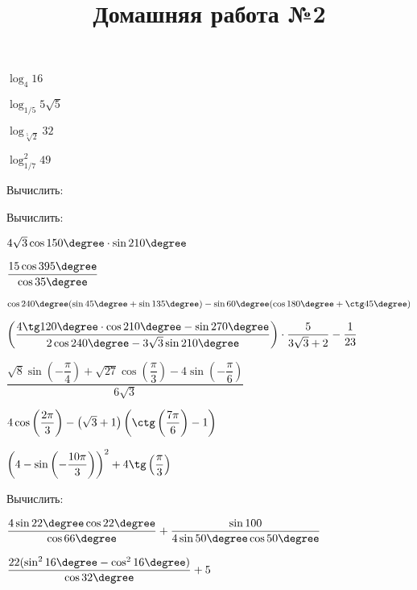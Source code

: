 \begin{listofex}
\begin{enumcols}[itemcolumns=4]
		\item \( \log_4 16 \)
		\item \( \log_{1/5}5\sqrt{5} \)
		\item \( \log_{\sqrt[5]{2}}32 \)
		\item \( \log_{1/7}^2 49 \)
	\end{enumcols}
	\item Вычислить:
	\begin{enumcols}[itemcolumns=1]
		\item {}
		\item {}
	\end{enumcols}
	\item {}
\end{listofex}
\newpage
\title{Домашняя работа №2}
\begin{listofex}
	\item Вычислить:
	\begin{enumcols}[itemcolumns=1]
		\item \( 4\sqrt{3}\cos150\degree\cdot\sin210\degree \) 
		\item \( \dfrac{15\cos395\degree}{\cos35\degree} \)
		\item \( \cos240\degree(\sin45\degree+\sin135\degree)-\sin60\degree(\cos180\degree+\ctg45\degree) \)
		\item \( \left( \dfrac{4\tg120\degree\cdot\cos210\degree-\sin270\degree}{2\cos240\degree-3\sqrt{3}\sin210\degree} \right)\cdot\dfrac{5}{3\sqrt{3}+2}-\dfrac{1}{23} \)
		\item \( \dfrac{\sqrt{8}\sin\left( -\dfrac{\pi}{4} \right)+\sqrt{27}\cos\left( \dfrac{\pi}{3} \right)-4\sin\left( -\dfrac{\pi}{6} \right)}{6\sqrt{3}} \) 
		\item \( 4\cos\left( \dfrac{2\pi}{3} \right)-\left( \sqrt{3}+1 \right)\left( \ctg\left( \dfrac{7\pi}{6} \right)-1 \right) \) 
		\item \( \left( 4 - \sin\left( -\dfrac{10\pi}{3} \right) \right)^2+4\tg\left( \dfrac{\pi}{3} \right) \) 
	\end{enumcols}
	\item Вычислить:
	\begin{enumcols}[itemcolumns=1]
		\item \( \dfrac{4\sin22\degree\cos22\degree}{\cos66\degree}+\dfrac{\sin100}{4\sin50\degree\cos50\degree} \)
		\item \( \dfrac{22(\sin^2 16\degree-\cos^2 16\degree)}{\cos32\degree}+5 \)
	\end{enumcols}
	
\end{listofex}
%
